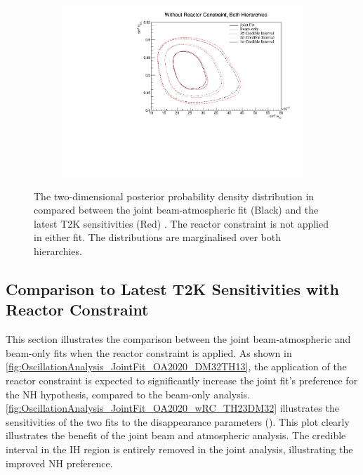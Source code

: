 \begin{figure}[h]
  \begin{subfigure}[t]{0.98\textwidth}
    \includegraphics[width=\textwidth, trim={0mm 0mm 0mm 0mm}, clip,page=1]{Figures/OA/JointFit_OA2020_Comp/ContourComparison_2D_th13_th23_BH_1_woRC_UnSmeared_CredibleInterval.pdf}
  \end{subfigure}
  \caption{The two-dimensional posterior probability density distribution in  compared between the joint beam-atmospheric fit (Black) and the latest T2K sensitivities (Red) \cite{Dunne2020-uf, t2k_tn_393}. The reactor constraint is not applied in either fit. The distributions are marginalised over both hierarchies.}
  \label{fig:OscillationAnalysis_JointFit_OA2020_TH13TH23}
\end{figure}

\clearpage
\subsection{Comparison to Latest T2K Sensitivities with Reactor Constraint}
\label{sec:OscillationAnalysis_JointFit_OA2020_wRC}
This section illustrates the comparison between the joint beam-atmospheric and beam-only fits when the reactor constraint is applied. As shown in \autoref{fig:OscillationAnalysis_JointFit_OA2020_DM32TH13}, the application of the reactor constraint is expected to significantly increase the joint fit's preference for the NH hypothesis, compared to the beam-only analysis. \autoref{fig:OscillationAnalysis_JointFit_OA2020_wRC_TH23DM32} illustrates the sensitivities of the two fits to the disappearance parameters (). This plot clearly illustrates the benefit of the joint beam and atmospheric analysis. The \quickmath{1\sigma} credible interval in the IH region is entirely removed in the joint analysis, illustrating the improved NH preference.

